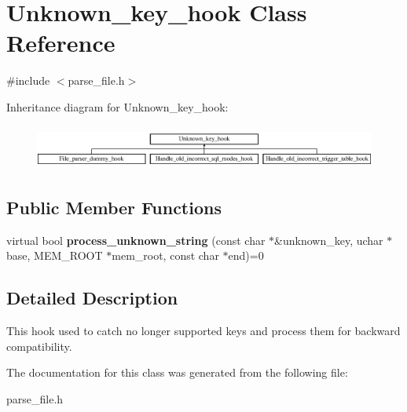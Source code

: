 \hypertarget{classUnknown__key__hook}{}\section{Unknown\+\_\+key\+\_\+hook Class Reference}
\label{classUnknown__key__hook}


{\ttfamily \#include $<$parse\+\_\+file.\+h$>$}

Inheritance diagram for Unknown\+\_\+key\+\_\+hook\+:\begin{figure}[H]
\begin{center}
\leavevmode
\includegraphics[height=1.469816cm]{classUnknown__key__hook}
\end{center}
\end{figure}
\subsection*{Public Member Functions}
\begin{DoxyCompactItemize}
\item 
\mbox{\label{classUnknown__key__hook_ab324630ea3f709bff5f6609e0a421370}} 
virtual bool {\bfseries process\+\_\+unknown\+\_\+string} (const char $\ast$\&unknown\+\_\+key, uchar $\ast$base, M\+E\+M\+\_\+\+R\+O\+OT $\ast$mem\+\_\+root, const char $\ast$end)=0
\end{DoxyCompactItemize}


\subsection{Detailed Description}
This hook used to catch no longer supported keys and process them for backward compatibility. 

The documentation for this class was generated from the following file\+:\begin{DoxyCompactItemize}
\item 
parse\+\_\+file.\+h\end{DoxyCompactItemize}
